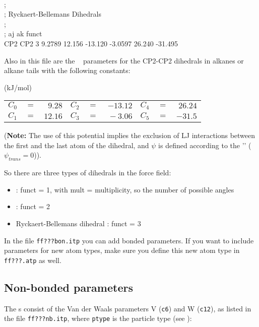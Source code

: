 \begin{tt}
[ dihedraltypes ] \\
;\\
; Ryckaert-Bellemans Dihedrals\\
;\\
; aj    ak      funct\\
CP2     CP2     3       9.2789  12.156  -13.120 -3.0597 26.240  -31.495\\
\end{tt}

Also in this file are the
~\cite{Ryckaert78} parameters for the
CP2-CP2 dihedrals in alkanes or alkane tails with the following
constants:

\begin{center}
(kJ/mol)\\
\begin{tabular}{llrllrllr}
$C_0$ & $=$ & $~ 9.28$ & $C_2$ & $=$ & $-13.12$ & $C_4$ & $=$ & $ 26.24$ \\
$C_1$ & $=$ & $ 12.16$ & $C_3$ & $=$ & $~-3.06$ & $C_5$ & $=$ & $-31.5 $ \\
\end{tabular}
\end{center}

({\bf Note:} The use of this potential implies the exclusion of LJ interactions
between the first and the last atom of the dihedral, and $\psi$ is defined
according to the '' ($\psi_{trans}=0$)).

So there are three types of dihedrals in the {\gromacs} force field:
\begin{itemize}
\item {} : funct = 1, with mult = multiplicity, so the
                                   number of possible angles
\item {} : funct = 2
\item Ryckaert-Bellemans dihedral : funct = 3
\end{itemize}
In the file {\tt ff???bon.itp} you can add bonded parameters. If you
want to include parameters for new atom types, make sure you define
this new atom type in {\tt ff???.atp} as well.

\subsection{Non-bonded parameters}
\label{subsec:nbpar}
The s consist of the Van der Waals parameters
V ({\tt c6}) and W ({\tt c12}), as listed in the file {\tt ff???nb.itp},
where {\tt ptype} is the particle type (see ):

